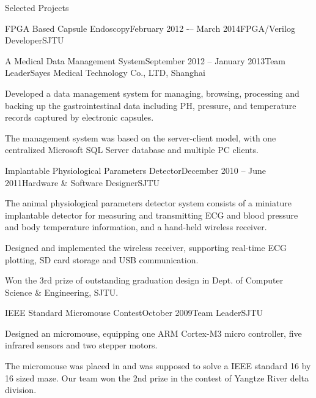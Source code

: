 \documentclass{resume} %
\begin{document}
\begin{rSection}{Selected Projects}
\begin{rSubsection}{FPGA Based Capsule Endoscopy}{February 2012 -– March 2014}{FPGA/Verilog Developer}{SJTU}
    \end{rSubsection}

    \begin{rSubsection}{A Medical Data Management System}{September 2012 -- January 2013}{Team Leader}{Sayes Medical Technology Co., LTD, Shanghai}

    \item Developed a data management system for managing, browsing, processing
        and backing up the gastrointestinal data including PH, pressure, and
        temperature records captured by electronic capsules.

    \item The management system was based on the server-client model, with one
        centralized Microsoft SQL Server database and multiple PC clients.

    \end{rSubsection}

    \begin{rSubsection}{Implantable Physiological Parameters Detector}{December 2010 -- June 2011}{Hardware \& Software Designer}{SJTU}

    \item The animal physiological parameters detector system consists of a
        miniature implantable detector for measuring and transmitting ECG and
        blood pressure and body temperature information, and a hand-held
        wireless receiver.

    \item Designed and implemented the wireless receiver, supporting real-time
        ECG plotting, SD card storage and USB communication.

    \item Won the 3rd prize of outstanding graduation design in Dept. of Computer
        Science \& Engineering, SJTU.

    \end{rSubsection}

    \begin{rSubsection}{IEEE Standard Micromouse Contest}{October 2009}{Team Leader}{SJTU}

    \item Designed an micromouse, equipping one ARM Cortex-M3 micro controller,
        five infrared sensors and two stepper motors.

    \item The micromouse was placed in and was supposed to solve a IEEE
        standard 16 by 16 sized maze.  Our team won the 2nd prize in the
        contest of Yangtze River delta division.

    \end{rSubsection}

\end{rSection}
\end{document}

